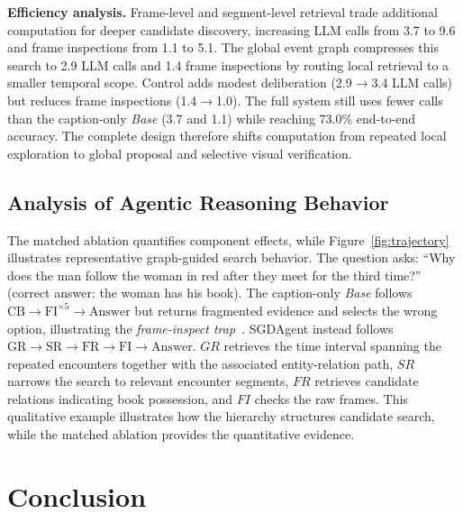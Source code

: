 \documentclass[letterpaper]{article} %
\begin{document}

\textbf{Efficiency analysis.}
Frame-level and segment-level retrieval trade additional computation for deeper candidate discovery, increasing LLM calls from 3.7 to 9.6 and frame inspections from 1.1 to 5.1.
The global event graph compresses this search to 2.9 LLM calls and 1.4 frame inspections by routing local retrieval to a smaller temporal scope.
Control adds modest deliberation (2.9$\to$3.4 LLM calls) but reduces frame inspections (1.4$\to$1.0).
The full system still uses fewer calls than the caption-only \emph{Base} (3.7 and 1.1) while reaching 73.0\% end-to-end accuracy.
The complete design therefore shifts computation from repeated local exploration to global proposal and selective visual verification.



\subsection{Analysis of Agentic Reasoning Behavior}
\label{sec:analysis}

The matched ablation quantifies component effects, while Figure~\ref{fig:trajectory} illustrates representative graph-guided search behavior.
The question asks: ``Why does the man follow the woman in red after they meet for the third time?'' (correct answer: the woman has his book).
The caption-only \emph{Base} follows $\mathrm{CB} \!\to\! \mathrm{FI}^{\times 5} \!\to\! \mathrm{Answer}$ but returns fragmented evidence and selects the wrong option, illustrating the \emph{frame-inspect trap}~\cite{deepvideo2025}.
SGDAgent instead follows $\mathrm{GR} \!\to\! \mathrm{SR} \!\to\! \mathrm{FR} \!\to\! \mathrm{FI} \!\to\! \mathrm{Answer}$.
$GR$ retrieves the time interval spanning the repeated encounters together with the associated entity-relation path, $SR$ narrows the search to relevant encounter segments, $FR$ retrieves candidate relations indicating book possession, and $FI$ checks the raw frames.
This qualitative example illustrates how the hierarchy structures candidate search, while the matched ablation provides the quantitative evidence.

\section{Conclusion}
\end{document}
